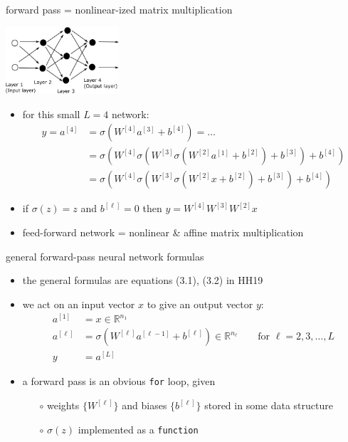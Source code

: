 \documentclass[xcolor={svgnames},
               hyperref={colorlinks,citecolor=DeepPink4,linkcolor=FireBrick,urlcolor=Maroon}]
               {beamer}
\newcommand{\RR}{\mathbb{R}}
\begin{document}
\begin{frame}{forward pass = nonlinear-ized matrix multiplication}

\begin{center}
\includegraphics[height=25mm]{figs/network}
\end{center}

\begin{itemize}
\item for this small $L=4$ network:
\begin{align*}
y = a^{[4]} &= \sigma\left(W^{[4]} a^{[3]} + b^{[4]}\right) = \dots \\
            &= \sigma\left(W^{[4]} \sigma\left(W^{[3]} \sigma\left(W^{[2]} a^{[1]} + b^{[2]}\right) + b^{[3]}\right) + b^{[4]}\right) \\
            &= \sigma\left(W^{[4]} \sigma\left(W^{[3]} \sigma\left(W^{[2]} x + b^{[2]}\right) + b^{[3]}\right) + b^{[4]}\right)
\end{align*}
\item if $\sigma(z)=z$ and $b^{[\ell]}=0$ then $y = W^{[4]} W^{[3]} W^{[2]} x$
\item feed-forward network = nonlinear \& affine matrix multiplication
\end{itemize}
\end{frame}


\begin{frame}{general forward-pass neural network formulas}

\begin{itemize}
\item the general formulas are equations (3.1), (3.2) in HH19
\item we act on an input vector $x$ to give an output vector $y$:
\begin{align*}
a^{[1]} &= x \in \RR^{n_1} \\
a^{[\ell]} &= \sigma\left(W^{[\ell]} a^{[\ell-1]} + b^{[\ell]}\right) \in \RR^{n_\ell} \qquad \text{for } \ell=2,3,\dots,L \\
y &= a^{[L]}
\end{align*}
\item a forward pass is an obvious \texttt{for} loop, given
    \begin{itemize}
    \item[$\circ$] weights $\{W^{[\ell]}\}$ and biases $\{b^{[\ell]}\}$ stored in some data structure
    \item[$\circ$] $\sigma(z)$ implemented as a \texttt{function}
    \end{itemize}
\end{itemize}
\end{frame}
\end{document}
